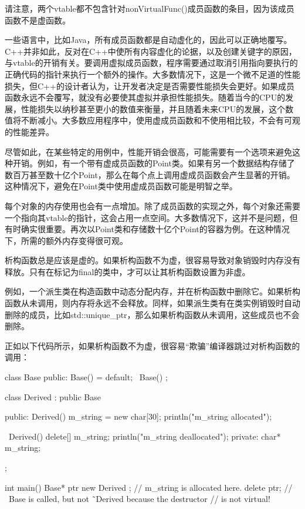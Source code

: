 请注意，两个vtable都不包含针对nonVirtualFunc()成员函数的条目，因为该成员函数不是虚函数。


一些语言中，比如Java，所有成员函数都是自动虚化的，因此可以正确地覆写。C++并非如此，反对在C++中使所有内容虚化的论据，以及创建关键字的原因，与vtable的开销有关。要调用虚拟成员函数，程序需要通过取消引用指向要执行的正确代码的指针来执行一个额外的操作。大多数情况下，这是一个微不足道的性能损失，但C++的设计者认为，让开发者决定是否需要性能损失会更好。如果成员函数永远不会覆写，就没有必要使其虚拟并承担性能损失。随着当今的CPU的发展，性能损失以纳秒甚至更小的数值来衡量，并且随着未来CPU的发展，这个数值将不断减小。大多数应用程序中，使用虚成员函数和不使用相比较，不会有可观的性能差异。

尽管如此，在某些特定的用例中，性能开销会很高，可能需要有一个选项来避免这种开销。例如，有一个带有虚成员函数的Point类。如果有另一个数据结构存储了数百万甚至数十亿个Point，那么在每个点上调用虚成员函数会产生显著的开销。这种情况下，避免在Point类中使用虚成员函数可能是明智之举。

每个对象的内存使用也会有一点增加。除了成员函数的实现之外，每个对象还需要一个指向其vtable的指针，这会占用一点空间。大多数情况下，这并不是问题，但有时确实很重要。再次以Point类和存储数十亿个Point的容器为例。在这种情况下，所需的额外内存变得很可观。


析构函数总是应该是虚的。如果析构函数不为虚，很容易导致对象销毁时内存没有释放。只有在标记为final的类中，才可以让其析构函数设置为非虚。

例如，一个派生类在构造函数中动态分配内存，并在析构函数中删除它。如果析构函数从未调用，则内存将永远不会释放。同样，如果派生类有在类实例销毁时自动删除的成员，比如std::unique\_ptr，那么如果析构函数从未调用，这些成员也不会删除。

正如以下代码所示，如果析构函数不为虚，很容易“欺骗”编译器跳过对析构函数的调用：

\begin{cpp}
class Base
{
    public:
        Base() = default;
        ~Base() {}
};

class Derived : public Base
{
    public:
        Derived()
        {
            m_string = new char[30];
            println("m_string allocated");
        }

        ~Derived()
        {
            delete[] m_string;
            println("m_string deallocated");
        }
    private:
        char* m_string;
};

int main()
{
    Base* ptr { new Derived {} }; // m_string is allocated here.
    delete ptr; // ~Base is called, but not ˜Derived because the destructor
                // is not virtual!
}
\end{cpp}

